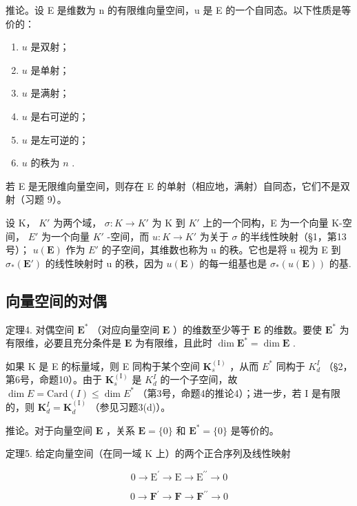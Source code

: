 推论。设 E 是维数为 n 的有限维向量空间，u 是 E 的一个自同态。以下性质是等价的：

\begin{enumerate}
\def\labelenumi{(\alph{enumi})}
\item
  \(u\) 是双射；
\item
  \(u\) 是单射；
\item
  \(u\) 是满射；
\item
  \(u\) 是右可逆的；
\item
  \(u\) 是左可逆的；
\item
  \(u\) 的秩为 \(n\) .
\end{enumerate}

若 E 是无限维向量空间，则存在 E 的单射（相应地，满射）自同态，它们不是双射（习题 9）。

设 K， \(K'\) 为两个域， \(\sigma:K\to K'\) 为 K 到 \(K'\) 上的一个同构，E 为一个向量 K-空间， \(E'\) 为一个向量 \(K'\) -空间，而 \(u:K\to K'\) 为关于 \(\sigma\) 的半线性映射（§1，第13号）； \(u(\mathbf{E})\) 作为 \(E'\) 的子空间，其维数也称为 u 的秩。它也是将 u 视为 E 到 \(\sigma_{*}(\mathbf{E}')\) 的线性映射时 u 的秩，因为 \(u(\mathbf{E})\) 的每一组基也是 \(\sigma_{*}(u(\mathbf{E}))\) 的基.

\subsection{向量空间的对偶}

定理4. 对偶空间 \(\mathbf{E}^*\) （对应向量空间 \(\mathbf{E}\) ）的维数至少等于 \(\mathbf{E}\) 的维数。要使 \(\mathbf{E}^*\) 为有限维，必要且充分条件是 \(\mathbf{E}\) 为有限维，且此时 \(\dim \mathbf{E}^* = \dim \mathbf{E}\) .

如果 K 是 E 的标量域，则 E 同构于某个空间 \(\mathbf{K}_{s}^{\mathrm{(I)}}\) ，从而 \(E^{*}\) 同构于 \(K_{d}^{I}\) （§2，第6号，命题10）。由于 \(\mathbf{K}_{s}^{\mathrm{(I)}}\) 是 \(K_{d}^{I}\) 的一个子空间，故 \(\dim E = \text{Card}(I) \leqslant \dim E^{*}\) （第3号，命题4的推论4）；进一步，若 I 是有限的，则 \(\mathbf{K}_{d}^{I} = \mathbf{K}_{d}^{\mathrm{(I)}}\) （参见习题3(d)）。

推论。对于向量空间 \(\mathbf{E}\) ，关系 \(\mathbf{E} = \{0\}\) 和 \(\mathbf{E}^{*} = \{0\}\) 是等价的。

定理5. 给定向量空间（在同一域 K 上）的两个正合序列及线性映射

\[
0 \rightarrow \mathrm{E} ^ {\prime} \rightarrow \mathrm{E} \rightarrow \mathrm{E} ^ {\prime \prime} \rightarrow 0
\]

\[
0 \to \mathbf {F} ^ {\prime} \to \mathbf {F} \to \mathbf {F} ^ {\prime \prime} \to 0
\]

